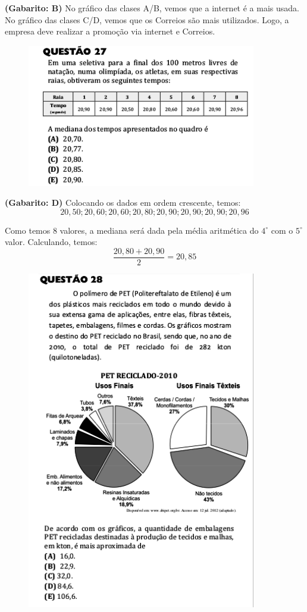 \documentclass[a4paper]{article}
\begin{document}
\par\textbf{(Gabarito: B)} No gráfico das clases A/B, vemos que a internet é a mais usada. No gráfico das clases C/D, vemos que os Correios são mais utilizados. Logo, a empresa deve realizar a promoção via internet e Correios.
\begin{figure}[H]
	\begin{center}
		\includegraphics[width=10cm]{L1Q27.png}
	\end{center}
\end{figure}
\par\textbf{(Gabarito: D)} Colocando os dados em ordem crescente, temos:
\begin{equation*}
20,50; 20,60; 20,60; 20,80; 20,90; 20,90; 20,90; 20,96
\end{equation*}
\par\vspace{0.3cm} Como temos $8$ valores, a mediana será dada pela média aritmética do $4^\circ$ com o $5^\circ$ valor. Calculando, temos:
\begin{equation*}
\frac{20,80 + 20,90}{2} = 20,85
\end{equation*}
\begin{figure}[H]
	\begin{center}
		\includegraphics[width=10cm]{L1Q28.png}
	\end{center}
\end{figure}
\end{document}
